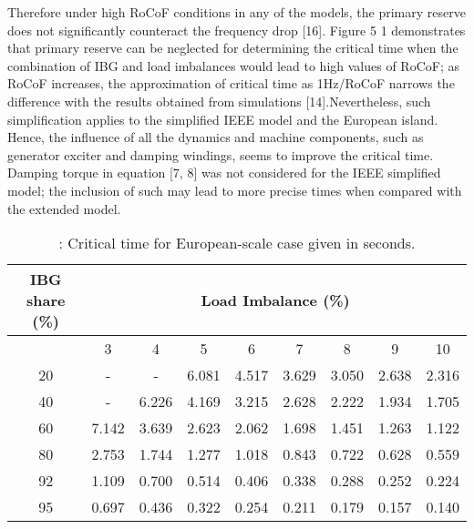 Therefore under high RoCoF conditions in any of the models, the primary reserve does not significantly counteract the frequency drop [16]. Figure 5 1 demonstrates that primary reserve can be neglected for determining the critical time when the combination of IBG and load imbalances would lead to high values of RoCoF; as RoCoF increases, the approximation of critical time as 1Hz/RoCoF narrows the difference with the results obtained from simulations [14].Nevertheless, such simplification applies to the simplified IEEE model and the European island. Hence, the influence of all the dynamics and machine components, such as
generator exciter and damping windings, seems to improve the critical time. Damping torque in equation [7, 8] was not considered for the IEEE simplified model; the inclusion of such may lead to more precise times when compared with the extended model.\\
\begin{table}[h]
	\caption{\label{tb:crtime}: Critical time for European-scale case given in seconds.}
	\centering
	\begin{tabular}{*9c}
		\toprule
		\textbf{IBG share (\%)}	& \multicolumn{8}{c}{\textbf{Load Imbalance (\%)}} \\
		\midrule
		{} & 3&	4&	5&	6&	7&	8&	9	&10 \\
		\midrule
		20&	-&	-&	6.081&	4.517&	3.629&	3.050&	2.638&	2.316\\
		40&	-&	6.226&	4.169&	3.215&	2.628&	2.222&	1.934&	1.705\\
		60	&7.142&	3.639&	2.623&	2.062&	1.698&	1.451&	1.263&	1.122\\
		80&	2.753&	1.744&	1.277&	1.018&	0.843&	0.722&	0.628&	0.559\\
		92&	1.109&	0.700&	0.514&	0.406&	0.338&	0.288&	0.252&	0.224\\
		95&	0.697&	0.436&	0.322&	0.254&	0.211&	0.179&	0.157&	0.140\\
		\bottomrule
	\end{tabular}
\end{table}







